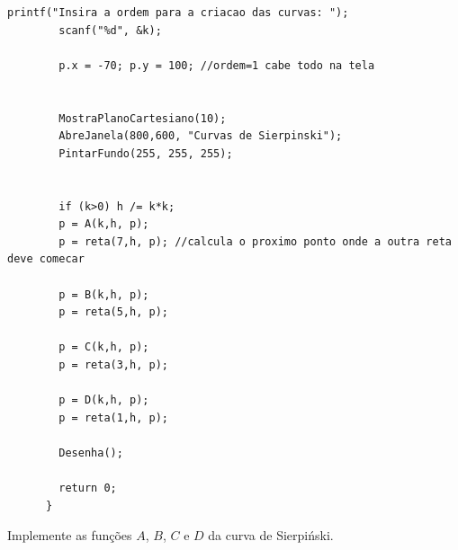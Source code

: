 \begin{renumerate}
\begin{lstlisting}[caption={Função main Curva de Sierpiński}, style=tuto, label={func:mainsier}]
        printf("Insira a ordem para a criacao das curvas: ");
        scanf("%d", &k);

        p.x = -70; p.y = 100; //ordem=1 cabe todo na tela


        MostraPlanoCartesiano(10);
        AbreJanela(800,600, "Curvas de Sierpinski");
        PintarFundo(255, 255, 255);


        if (k>0) h /= k*k;
        p = A(k,h, p); 
        p = reta(7,h, p); //calcula o proximo ponto onde a outra reta deve comecar

        p = B(k,h, p); 
        p = reta(5,h, p); 

        p = C(k,h, p); 
        p = reta(3,h, p);

        p = D(k,h, p); 
        p = reta(1,h, p);

        Desenha();

        return 0;
      }
      \end{lstlisting}

  Implemente as funções $A$, $B$, $C$ e $D$ da curva de Sierpiński.


\end{renumerate}
